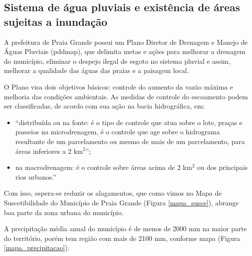 	\subsection{Sistema de água pluviais e existência de áreas sujeitas a inundação}
	
	A prefeitura de Praia Grande possui um Plano Diretor de Drenagem e Manejo de Águas Pluviais (\gls{pddmap}), que delimita metas e ações para melhorar a drenagem do município, eliminar o despejo ilegal de esgoto no sistema pluvial e assim, melhorar a qualidade das águas das praias e a paisagem local.
	
	O Plano visa  dois objetivos básicos: controle do aumento da vazão máxima e melhoria das condições ambientais. As medidas de controle do escoamento podem ser classificadas, de acordo com sua ação na bacia hidrográfica, em:
	
	\begin{citacao}
		\begin{itemize}
			\item ``distribuída ou na fonte: é o tipo de controle que atua sobre o lote, praças e passeios na microdrenagem, é o controle que age sobre o hidrograma resultante de um parcelamento ou mesmo de mais de um parcelamento, para áreas inferiores a 2 km$^{2}$'';
			\item na macrodrenagem: é o controle sobre áreas acima de 2 km$^{2}$ ou dos principais rios urbanos.'' \cite[p.7]{fcth2015a}
		\end{itemize}
	\end{citacao}

	Com isso, espera-se reduzir os alagamentos, que como vimos no Mapa de Suscetibilidade do Município de Praia Grande (Figura \ref{mapa_susce}), abrange boa parte da zona urbana do município.
	
	A precipitação média anual do município é de menos de 2000 mm na maior parte do território, porém tem região com mais de 2100 mm, conforme mapa (Figura \ref{mapa_precipitacao}).
	
